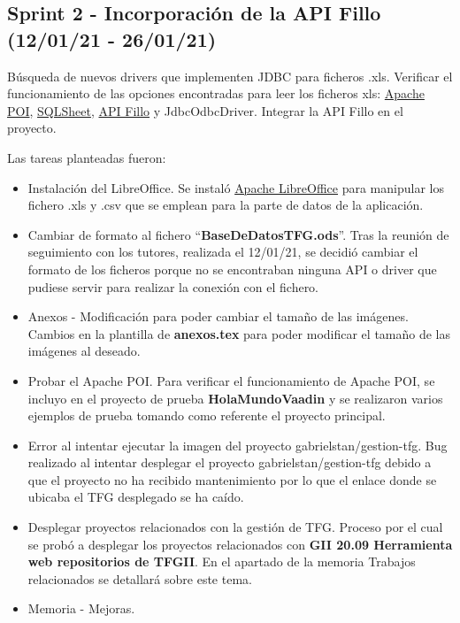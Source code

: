
\subsection{Sprint 2 - Incorporación de la API Fillo (12/01/21 - 26/01/21)}
Búsqueda de nuevos drivers que implementen JDBC para ficheros .xls. Verificar el funcionamiento de las opciones encontradas para leer los ficheros xls: \href{https://poi.apache.org/}{Apache POI}, \href{https://code.google.com/archive/p/sqlsheet/}{SQLSheet}, \href{https://codoid.com/fillo/}{API Fillo} y JdbcOdbcDriver. Integrar la API Fillo en el proyecto. 

Las tareas planteadas fueron:
\begin{itemize}
	\tightlist
	\item Instalación del LibreOffice. 
		Se instaló \href{https://es.libreoffice.org/}{Apache LibreOffice} para manipular los fichero .xls y .csv que se emplean para la parte de datos de la aplicación.
	\item Cambiar de formato al fichero ``\textbf{BaseDeDatosTFG.ods}''. 
		Tras la reunión de seguimiento con los tutores, realizada el 12/01/21, se decidió cambiar el formato de los ficheros porque no se encontraban ninguna API o driver que pudiese servir para realizar la conexión con el fichero.
	\item Anexos - Modificación para poder cambiar el tamaño de las imágenes.
		Cambios en la plantilla de \textbf{anexos.tex} para poder modificar el tamaño de las imágenes al deseado.
	\item Probar el Apache POI. 
		Para verificar el funcionamiento de Apache POI, se incluyo en el proyecto de prueba \textbf{HolaMundoVaadin} y se realizaron varios ejemplos de prueba tomando como referente el proyecto principal.
	\item Error al intentar ejecutar la imagen del proyecto gabrielstan/gestion-tfg. 
		Bug realizado al intentar desplegar el proyecto  gabrielstan/gestion-tfg debido a que el proyecto no ha recibido mantenimiento por lo que el enlace donde se ubicaba el TFG desplegado se ha caído. 
	\item Desplegar proyectos relacionados con la gestión de TFG. 
		Proceso por el cual se probó a desplegar los proyectos relacionados con \textbf{GII 20.09 Herramienta web repositorios de TFGII}. En el apartado de la memoria Trabajos relacionados se detallará sobre este tema. 
	\item Memoria - Mejoras. 

\end{itemize}
